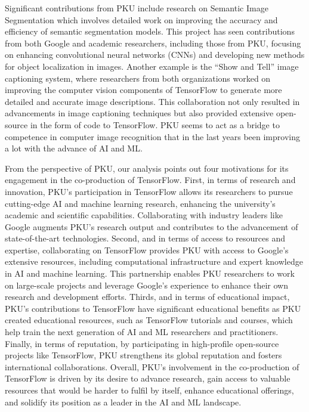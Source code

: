 \documentclass[CHICAGO,Times1COL]{WileyNJDv5} %
\begin{document}
Significant contributions from PKU include research on Semantic Image Segmentation which involves detailed work on improving the accuracy and efficiency of semantic segmentation models. This project has seen contributions from both Google and academic researchers, including those from PKU, focusing on enhancing convolutional neural networks (CNNs) and developing new methods for object localization in images​. Another example is the ``Show and Tell'' image captioning system, where researchers from both organizations worked on improving the computer vision components of TensorFlow to generate more detailed and accurate image descriptions. This collaboration not only resulted in advancements in image captioning techniques but also provided extensive open-source in the form of code to TensorFlow.  PKU seems to act as a bridge to competence in computer image recognition that in the last years been improving a lot with the advance of \ac{AI} and \ac{ML}.

From the perspective of PKU, our analysis points out four motivations for its engagement in the co-production of TensorFlow. First, in terms of research and innovation, PKU's participation in TensorFlow allows its researchers to pursue cutting-edge AI and machine learning research, enhancing the university's academic and scientific capabilities. Collaborating with industry leaders like Google augments PKU's research output and contributes to the advancement of state-of-the-art technologies. Second, and in terms of access to resources and expertise, collaborating on TensorFlow provides PKU with access to Google's extensive resources, including computational infrastructure and expert knowledge in AI and machine learning. This partnership enables PKU researchers to work on large-scale projects and leverage Google's experience to enhance their own research and development efforts. Thirds, and in terms of educational impact, PKU's contributions to TensorFlow have significant educational benefits as PKU created educational resources, such as TensorFlow tutorials and courses, which help train the next generation of \ac{AI} and \ac{ML} researchers and practitioners. Finally, in terms of reputation, by participating in high-profile open-source projects like TensorFlow, PKU strengthens its global reputation and fosters international collaborations.
Overall, PKU's involvement in the co-production of TensorFlow is driven by its desire to advance research, gain access to valuable resources that would be harder to fulfil by itself, enhance educational offerings, and solidify its position as a leader in the \ac{AI} and \ac{ML} landscape.
\end{document}
